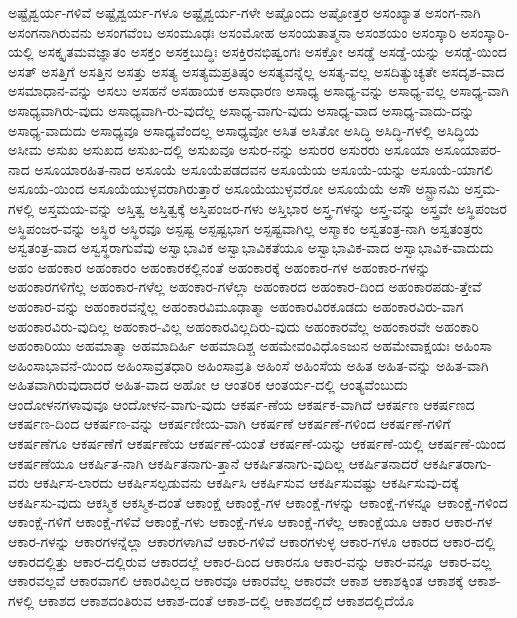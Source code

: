 {ಅಷ್ಟೈಶ್ವರ್ಯ-ಗಳಿವೆ
ಅಷ್ಟೈಶ್ವರ್ಯ-ಗಳೂ
ಅಷ್ಟೈಶ್ವರ್ಯ-ಗಳೇ
ಅಷ್ಟೊಂದು
ಅಷ್ಟೋತ್ತರ
ಅಸಂಖ್ಯಾತ
ಅಸಂಗ-ನಾಗಿ
ಅಸಂಗನಾಗಿರುವನು
ಅಸಂಗವೆಂಬ
ಅಸಂಮೂಢಃ
ಅಸಂಮೋಹ
ಅಸಂಯತಾತ್ಮನಾ
ಅಸಂಶಯಂ
ಅಸಂಸ್ಕಾರಿ
ಅಸಂಸ್ಕಾರಿ-ಯಲ್ಲಿ
ಅಸಕ್ಕೃತಮವಜ್ಞಾತಂ
ಅಸಕ್ತಂ
ಅಸಕ್ತಬುದ್ಧಿಃ
ಅಸಕ್ತಿರನಭಿಷ್ವಂಗಃ
ಅಸಕ್ತೋ
ಅಸಡ್ಡೆ
ಅಸಡ್ಡೆ-ಯನ್ನು
ಅಸಡ್ಡೆ-ಯಿಂದ
ಅಸತ್
ಅಸತ್ತಿಗೆ
ಅಸತ್ತಿನ
ಅಸತ್ತು
ಅಸತ್ಯ
ಅಸತ್ಯಮಪ್ರತಿಷ್ಠಂ
ಅಸತ್ಯವನ್ನೆಲ್ಲ
ಅಸತ್ಯ-ವಲ್ಲ
ಅಸದಿತ್ಯುಚ್ಯತೇ
ಅಸದೃಶ-ವಾದ
ಅಸಮಾಧಾನ-ವನ್ನು
ಅಸಲು
ಅಸಹನೆ
ಅಸಹಾಯಕ
ಅಸಾಧಾರಣ
ಅಸಾಧ್ಯ
ಅಸಾಧ್ಯ-ವನ್ನು
ಅಸಾಧ್ಯ-ವಲ್ಲ
ಅಸಾಧ್ಯ-ವಾಗಿ
ಅಸಾಧ್ಯವಾಗಿರು-ವುದು
ಅಸಾಧ್ಯವಾಗಿ-ರು-ವುದೆಲ್ಲ
ಅಸಾಧ್ಯ-ವಾಗು-ವುದು
ಅಸಾಧ್ಯ-ವಾದ
ಅಸಾಧ್ಯ-ವಾದು-ದನ್ನು
ಅಸಾಧ್ಯ-ವಾದುದು
ಅಸಾಧ್ಯವೂ
ಅಸಾಧ್ಯವೆಂದಲ್ಲ
ಅಸಾಧ್ಯವೋ
ಅಸಿತ
ಅಸಿತೋ
ಅಸಿದ್ಧಿ
ಅಸಿದ್ಧಿ-ಗಳಲ್ಲಿ
ಅಸಿದ್ಧಿಯ
ಅಸೀಮ
ಅಸುಖ
ಅಸುಖದ
ಅಸುಖ-ದಲ್ಲಿ
ಅಸುಖವೂ
ಅಸುರ-ನನ್ನು
ಅಸುರರ
ಅಸುರರು
ಅಸೂಯಾ
ಅಸೂಯಾಪರ-ನಾದ
ಅಸೂಯಾರಹಿತ-ನಾದ
ಅಸೂಯೆ
ಅಸೂಯೆಪಡದವನ
ಅಸೂಯೆಯ
ಅಸೂಯೆ-ಯನ್ನು
ಅಸೂಯೆ-ಯಾಗಲಿ
ಅಸೂಯೆ-ಯಿಂದ
ಅಸೂಯೆಯುಳ್ಳವರಾಗಿರುತ್ತಾರೆ
ಅಸೂಯೆಯುಳ್ಳವರೋ
ಅಸೂಯೆಯೆ
ಅಸೌ
ಅಸ್ಟ್ರಾನಮಿ
ಅಸ್ತಮ-ಗಳಲ್ಲಿ
ಅಸ್ತಮಯ-ವನ್ನು
ಅಸ್ತಿತ್ವ
ಅಸ್ತಿತ್ವಕ್ಕೆ
ಅಸ್ತಿಪಂಜರ-ಗಳು
ಅಸ್ತಿಭಾರ
ಅಸ್ತ್ರ-ಗಳನ್ನು
ಅಸ್ತ್ರ-ವನ್ನು
ಅಸ್ತ್ರವೇ
ಅಸ್ಥಿಪಂಜರ
ಅಸ್ಥಿಪಂಜರ-ವನ್ನು
ಅಸ್ಥಿರ
ಅಸ್ಥಿರವೂ
ಅಸ್ಪಷ್ಟ
ಅಸ್ಪಷ್ಟಭಾಗ
ಅಸ್ಪಷ್ಟವಾಗಿಲ್ಲ
ಅಸ್ಮಾಕಂ
ಅಸ್ವತಂತ್ರ-ನಾಗಿ
ಅಸ್ವತಂತ್ರರು
ಅಸ್ವತಂತ್ರ-ವಾದ
ಅಸ್ವಸ್ಥರಾಗುವೆವು
ಅಸ್ವಾಭಾವಿಕ
ಅಸ್ವಾಭಾವಿಕತೆಯೂ
ಅಸ್ವಾಭಾವಿಕ-ವಾದ
ಅಸ್ವಾಭಾವಿಕ-ವಾದುದು
ಅಹಂ
ಅಹಂಕಾರ
ಅಹಂಕಾರಂ
ಅಹಂಕಾರಕಲ್ಲಿನಂತೆ
ಅಹಂಕಾರಕ್ಕೆ
ಅಹಂಕಾರ-ಗಳ
ಅಹಂಕಾರ-ಗಳನ್ನು
ಅಹಂಕಾರಗಳಿಗೆಲ್ಲ
ಅಹಂಕಾರ-ಗಳೆಲ್ಲ
ಅಹಂಕಾರ-ಗಳೆಲ್ಲಾ
ಅಹಂಕಾರದ
ಅಹಂಕಾರ-ದಿಂದ
ಅಹಂಕಾರಪಡು-ತ್ತೇವೆ
ಅಹಂಕಾರ-ವನ್ನು
ಅಹಂಕಾರವನ್ನೆಲ್ಲ
ಅಹಂಕಾರವಿಮೂಢಾತ್ಮಾ
ಅಹಂಕಾರವಿರಕೂಡದು
ಅಹಂಕಾರವಿರು-ವಾಗ
ಅಹಂಕಾರವಿರು-ವುದಿಲ್ಲ
ಅಹಂಕಾರ-ವಿಲ್ಲ
ಅಹಂಕಾರವಿಲ್ಲದಿರು-ವುದು
ಅಹಂಕಾರವೆಲ್ಲ
ಅಹಂಕಾರವೇ
ಅಹಂಕಾರಿ
ಅಹಂಕಾರಿಯು
ಅಹಮಾತ್ಮಾ
ಅಹಮಾದಿರ್ಹಿ
ಅಹಮಾದಿಶ್ಚ
ಅಹಮೇವಂವಿಧೊಽಜುನ
ಅಹಮೇವಾಕ್ಷಯಃ
ಅಹಿಂಸಾ
ಅಹಿಂಸಾಭಾವನೆ-ಯಿಂದ
ಅಹಿಂಸಾವ್ರತಧಾರಿ
ಅಹಿಂಸಾವ್ರತಿ
ಅಹಿಂಸೆ
ಅಹಿಂಸೆಯ
ಅಹಿತ
ಅಹಿತ-ವನ್ನು
ಅಹಿತ-ವಾಗಿ
ಅಹಿತವಾಗಿರುವುದಾದರೆ
ಅಹಿತ-ವಾದ
ಅಹೋ
ಆ
ಆಂತರಿಕ
ಆಂತರ್ಯ-ದಲ್ಲಿ
ಆಂತ್ಯವೆಂಬುದು
ಆಂದೋಳನಗಳಾವುವೂ
ಆಂದೋಳನ-ವಾಗು-ವುದು
ಆಕರ್ಷ-ಣೆಯ
ಆಕರ್ಷಕ-ವಾಗಿದೆ
ಆಕರ್ಷಣ
ಆಕರ್ಷಣದ
ಆಕರ್ಷಣ-ದಿಂದ
ಆಕರ್ಷಣ-ವನ್ನು
ಆಕರ್ಷಣೀಯ-ವಾಗಿ
ಆಕರ್ಷಣೆ
ಆಕರ್ಷಣೆ-ಗಳಿಂದ
ಆಕರ್ಷಣೆ-ಗಳಿಗೆ
ಆಕರ್ಷಣೆಗೂ
ಆಕರ್ಷಣೆಗೆ
ಆಕರ್ಷಣೆಯ
ಆಕರ್ಷಣೆ-ಯಂತೆ
ಆಕರ್ಷಣೆ-ಯನ್ನು
ಆಕರ್ಷಣೆ-ಯಲ್ಲಿ
ಆಕರ್ಷಣೆ-ಯಿಂದ
ಆಕರ್ಷಣೆಯೂ
ಆಕರ್ಷಿತ-ನಾಗಿ
ಆಕರ್ಷಿತನಾಗು-ತ್ತಾನೆ
ಆಕರ್ಷಿತನಾಗು-ವುದಿಲ್ಲ
ಆಕರ್ಷಿತನಾದರೆ
ಆಕರ್ಷಿತರಾಗು-ವರು
ಆಕರ್ಷಿಸ-ಲಾರದು
ಆಕರ್ಷಿಸಲ್ಪಡುವನು
ಆಕರ್ಷಿಸಿ
ಆಕರ್ಷಿಸುವ
ಆಕರ್ಷಿಸುವಷ್ಟು
ಆಕರ್ಷಿಸುವು-ದಕ್ಕೆ
ಆಕರ್ಷಿಸು-ವುದು
ಆಕಸ್ಮಿಕ
ಆಕಸ್ಮಿಕ-ದಂತೆ
ಆಕಾಂಕ್ಷೆ
ಆಕಾಂಕ್ಷೆ-ಗಳ
ಆಕಾಂಕ್ಷೆ-ಗಳನ್ನು
ಆಕಾಂಕ್ಷೆ-ಗಳನ್ನೂ
ಆಕಾಂಕ್ಷೆ-ಗಳಿಂದ
ಆಕಾಂಕ್ಷೆ-ಗಳಿಗೆ
ಆಕಾಂಕ್ಷೆ-ಗಳಿವೆ
ಆಕಾಂಕ್ಷೆ-ಗಳು
ಆಕಾಂಕ್ಷೆ-ಗಳೂ
ಆಕಾಂಕ್ಷೆ-ಗಳೆಲ್ಲ
ಆಕಾಂಕ್ಷೆಯೂ
ಆಕಾರ
ಆಕಾರ-ಗಳ
ಆಕಾರ-ಗಳನ್ನು
ಆಕಾರಗಳನ್ನೆಲ್ಲಾ
ಆಕಾರಗಳಾಗಿವೆ
ಆಕಾರ-ಗಳಿವೆ
ಆಕಾರಗಳುಳ್ಳ
ಆಕಾರ-ಗಳೂ
ಆಕಾರದ
ಆಕಾರ-ದಲ್ಲಿ
ಆಕಾರದಲ್ಲಿತ್ತು
ಆಕಾರ-ದಲ್ಲಿರುವ
ಆಕಾರದಲ್ಲೆ
ಆಕಾರ-ದಿಂದ
ಆಕಾರನೂ
ಆಕಾರ-ವನ್ನು
ಆಕಾರ-ವನ್ನೂ
ಆಕಾರ-ವಲ್ಲ
ಆಕಾರವಲ್ಲವೆ
ಆಕಾರವಾಗಲಿ
ಆಕಾರವಿಲ್ಲದ
ಆಕಾರವೂ
ಆಕಾರವೆಲ್ಲ
ಆಕಾರವೇ
ಆಕಾಶ
ಆಕಾಶಕ್ಕಿಂತ
ಆಕಾಶಕ್ಕೆ
ಆಕಾಶ-ಗಳಲ್ಲಿ
ಆಕಾಶದ
ಆಕಾಶದಂತಿರುವ
ಆಕಾಶ-ದಂತೆ
ಆಕಾಶ-ದಲ್ಲಿ
ಆಕಾಶದಲ್ಲಿದೆ
ಆಕಾಶದಲ್ಲಿದೆಯೊ
}
